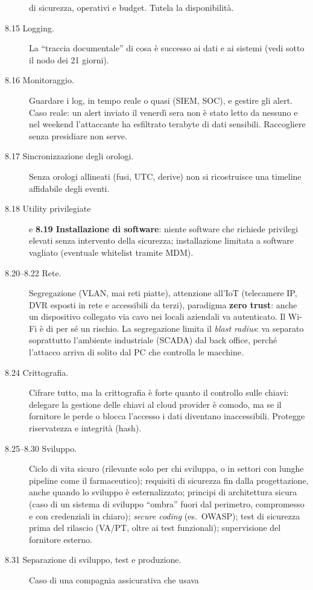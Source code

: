 \begin{description}
    di sicurezza, operativi e budget. Tutela la disponibilità.
  \item[8.15 Logging.] La ``traccia documentale'' di cosa è successo ai dati e ai sistemi (vedi sotto il
    nodo dei 21 giorni).
  \item[8.16 Monitoraggio.] Guardare i log, in tempo reale o quasi (SIEM, SOC), e gestire gli alert.
    Caso reale: un alert inviato il venerdì sera non è stato letto da nessuno e nel weekend l'attaccante
    ha esfiltrato terabyte di dati sensibili. Raccogliere senza presidiare non serve.
  \item[8.17 Sincronizzazione degli orologi.] Senza orologi allineati (fusi, UTC, derive) non si ricostruisce
    una timeline affidabile degli eventi.
  \item[8.18 Utility privilegiate] e \textbf{8.19 Installazione di software}: niente software che richiede
    privilegi elevati senza intervento della sicurezza; installazione limitata a software vagliato
    (eventuale whitelist tramite MDM).
  \item[8.20--8.22 Rete.] Segregazione (VLAN, mai reti piatte), attenzione all'IoT (telecamere IP, DVR
    esposti in rete e accessibili da terzi), paradigma \textbf{zero trust}: anche un dispositivo collegato
    via cavo nei locali aziendali va autenticato. Il Wi-Fi è di per sé un rischio. La segregazione limita
    il \emph{blast radius}: va separato soprattutto l'ambiente industriale (SCADA) dal back office, perché
    l'attacco arriva di solito dal PC che controlla le macchine.
  \item[8.24 Crittografia.] Cifrare tutto, ma la crittografia è forte quanto il controllo sulle chiavi:
    delegare la gestione delle chiavi al cloud provider è comodo, ma se il fornitore le perde o blocca
    l'accesso i dati diventano inaccessibili. Protegge riservatezza e integrità (hash).
  \item[8.25--8.30 Sviluppo.] Ciclo di vita sicuro (rilevante solo per chi sviluppa, o in settori con
    lunghe pipeline come il farmaceutico); requisiti di sicurezza fin dalla progettazione, anche quando lo
    sviluppo è esternalizzato; principi di architettura sicura (caso di un sistema di sviluppo ``ombra''
    fuori dal perimetro, compromesso e con credenziali in chiaro); \emph{secure coding} (es.\ OWASP); test di
    sicurezza prima del rilascio (VA/PT, oltre ai test funzionali); supervisione del fornitore esterno.
  \item[8.31 Separazione di sviluppo, test e produzione.] Caso di una compagnia assicurativa che usava

\end{description}
